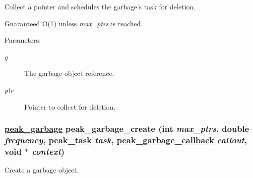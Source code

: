 Collect a pointer and schedules the garbage's task for deletion. 

Guaranteed O(1) unless {\em max\_\-ptrs\/} is reached.

\begin{Desc}
\item[Parameters:]
\begin{description}
\item[{\em g}]The garbage object reference. \item[{\em ptr}]Pointer to collect for deletion. \end{description}
\end{Desc}
\hypertarget{group__garbage_ga2}{
\subsubsection[peak\_\-garbage\_\-create]{\setlength{\rightskip}{0pt plus 5cm}\hyperlink{group__garbage_ga0}{peak\_\-garbage} peak\_\-garbage\_\-create (int {\em max\_\-ptrs}, double {\em frequency}, \hyperlink{group__task__common_ga0}{peak\_\-task} {\em task}, \hyperlink{group__garbage_ga1}{peak\_\-garbage\_\-callback} {\em callout}, void $\ast$ {\em context})}}
\label{group__garbage_ga2}


Create a garbage object. 

